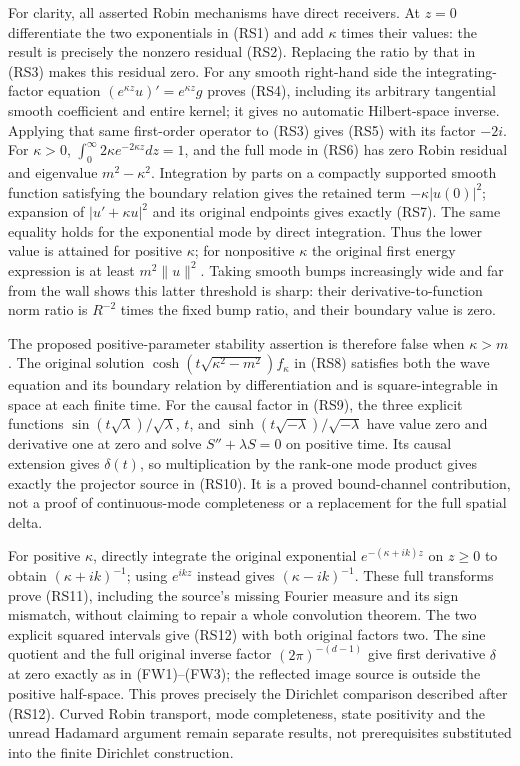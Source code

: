 \documentclass[
  11pt,
]{article}
\begin{document}
For clarity, all asserted Robin mechanisms have direct receivers. At
\(z=0\) differentiate the two exponentials in (RS1) and add \(\kappa\)
times their values: the result is precisely the nonzero residual (RS2).
Replacing the ratio by that in (RS3) makes this residual zero. For any
smooth right-hand side the integrating-factor equation
\((e^{\kappa z}u)'=e^{\kappa z}g\) proves (RS4), including its arbitrary
tangential smooth coefficient and entire kernel; it gives no automatic
Hilbert-space inverse. Applying that same first-order operator to (RS3)
gives (RS5) with its factor \(-2i\). For \(\kappa>0\),
\(\int_0^\infty2\kappa e^{-2\kappa z}dz=1\), and the full mode in (RS6)
has zero Robin residual and eigenvalue \(m^2-\kappa^2\). Integration by
parts on a compactly supported smooth function satisfying the boundary
relation gives the retained term \(-\kappa|u(0)|^2\); expansion of
\(|u'+\kappa u|^2\) and its original endpoints gives exactly (RS7). The
same equality holds for the exponential mode by direct integration. Thus
the lower value is attained for positive \(\kappa\); for nonpositive
\(\kappa\) the original first energy expression is at least
\(m^2\|u\|^2\). Taking smooth bumps increasingly wide and far from the
wall shows this latter threshold is sharp: their derivative-to-function
norm ratio is \(R^{-2}\) times the fixed bump ratio, and their boundary
value is zero.

The proposed positive-parameter stability assertion is therefore false
when \(\kappa>m\). The original solution
\(\cosh(t\sqrt{\kappa^2-m^2})f_\kappa\) in (RS8) satisfies both the wave
equation and its boundary relation by differentiation and is
square-integrable in space at each finite time. For the causal factor in
(RS9), the three explicit functions
\(\sin(t\sqrt\lambda)/\sqrt\lambda\), \(t\), and
\(\sinh(t\sqrt{-\lambda})/\sqrt{-\lambda}\) have value zero and
derivative one at zero and solve \(S''+\lambda S=0\) on positive time.
Its causal extension gives \(\delta(t)\), so multiplication by the
rank-one mode product gives exactly the projector source in (RS10). It
is a proved bound-channel contribution, not a proof of continuous-mode
completeness or a replacement for the full spatial delta.

For positive \(\kappa\), directly integrate the original exponential
\(e^{-(\kappa+ik)z}\) on \(z\geq0\) to obtain \((\kappa+ik)^{-1}\);
using \(e^{ikz}\) instead gives \((\kappa-ik)^{-1}\). These full
transforms prove (RS11), including the source's missing Fourier measure
and its sign mismatch, without claiming to repair a whole convolution
theorem. The two explicit squared intervals give (RS12) with both
original factors two. The sine quotient and the full original inverse
factor \((2\pi)^{-(d-1)}\) give first derivative \(\delta\) at zero
exactly as in (FW1)--(FW3); the reflected image source is outside the
positive half-space. This proves precisely the Dirichlet comparison
described after (RS12). Curved Robin transport, mode completeness, state
positivity and the unread Hadamard argument remain separate results, not
prerequisites substituted into the finite Dirichlet construction.
\end{document}
